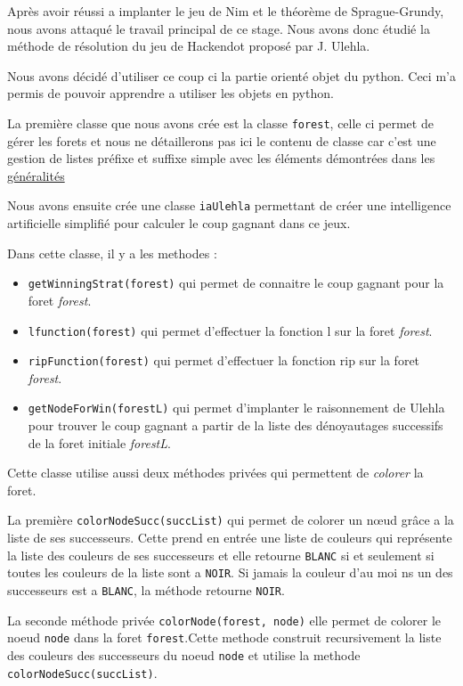 Après avoir réussi a implanter le jeu de Nim et le théorème de Sprague-Grundy, nous avons attaqué le travail principal de ce stage. Nous avons donc étudié la méthode de résolution du jeu de Hackendot proposé par J. Ulehla.

Nous avons décidé d'utiliser ce coup ci la partie orienté objet du python. Ceci m'a permis de pouvoir apprendre a utiliser les objets en python.

La première classe que nous avons crée est la classe \texttt{forest}, celle ci permet de gérer les forets et nous ne détaillerons pas ici le contenu de classe car c'est une gestion de listes préfixe et suffixe simple avec les éléments démontrées dans les \hyperlink{GenArbres}{généralités}

Nous avons ensuite crée une classe \texttt{iaUlehla} permettant de créer une intelligence artificielle simplifié pour calculer le coup gagnant dans ce jeux.

Dans cette classe, il y a les methodes :
\begin{itemize}
  \item \texttt{getWinningStrat(forest)} qui permet de connaitre le coup gagnant pour la foret \textit{forest}.
  \item \texttt{lfunction(forest)} qui permet d'effectuer la fonction l sur la foret \textit{forest}.
  \item \texttt{ripFunction(forest)} qui permet d'effectuer la fonction rip sur la foret \textit{forest}.
  \item \texttt{getNodeForWin(forestL)} qui permet d'implanter le raisonnement de Ulehla pour trouver le coup gagnant a partir de la liste des dénoyautages successifs de la foret initiale \textit{forestL}.
\end{itemize}

Cette classe utilise aussi deux méthodes privées qui permettent de \textit{colorer} la foret.

La première \texttt{colorNodeSucc(succList)} qui permet de colorer un nœud grâce a la liste de ses successeurs. Cette prend en entrée une liste de couleurs qui représente la liste des couleurs de ses successeurs et elle retourne \texttt{BLANC} si et seulement si toutes les couleurs de la liste sont a \texttt{NOIR}. Si jamais la couleur d'au moi ns un des successeurs est a \texttt{BLANC}, la méthode retourne \texttt{NOIR}.

La seconde méthode privée \texttt{colorNode(forest, node)} elle permet de colorer le noeud \texttt{node} dans la foret \texttt{forest}.Cette methode construit recursivement la liste des couleurs des successeurs du noeud \texttt{node} et utilise la methode \texttt{colorNodeSucc(succList)}.

